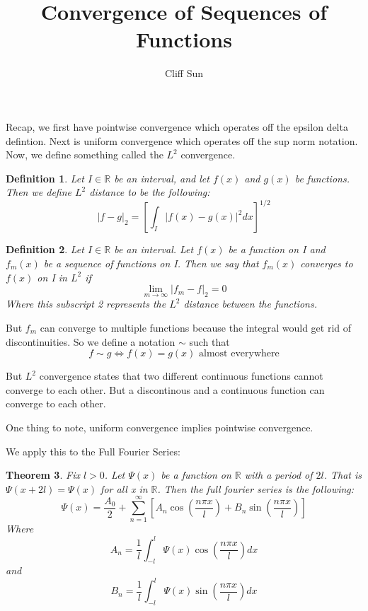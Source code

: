 \documentclass{article}
\title{Convergence of Sequences of Functions}
\author{Cliff Sun}
\newtheorem{theorem}{Theorem}[section]
\newtheorem{definition}[theorem]{Definition}
\begin{document}
\maketitle

Recap, we first have pointwise convergence which operates off the epsilon delta defintion. Next is uniform convergence which operates off the sup norm notation. Now, we define something called the $L^2$ convergence. 

\begin{definition}
    Let $I \in \mathbb{R}$ be an interval, and let $f(x)$ and $g(x)$ be functions. Then we define $L^{2}$ distance to be the following:
    \begin{equation}
        |f - g|_{2} = [ \int_{I}|f(x) - g(x)|^2 dx]^{1/2}
    \end{equation}
\end{definition}

\begin{definition}
    Let $I \in \mathbb{R}$ be an interval. Let $f(x)$ be a function on I and $f_m(x)$ be a sequence of functions on I. Then we say that $f_m(x)$ converges to $f(x)$ on I in $L^2$ if 
    \begin{equation}
        \lim_{m \rightarrow \infty} |f_m - f|_{2} = 0
    \end{equation}
    Where this subscript 2 represents the $L^2$ distance between the functions. 
\end{definition}

But $f_m$ can converge to multiple functions because the integral would get rid of discontinuities. So we define a notation $\sim$ such that 
\begin{equation}
    f \sim g \iff \textrm{$f(x) = g(x)$ almost everywhere}
\end{equation}

But $L^2$ convergence states that two different continuous functions cannot converge to each other. But a discontinous and a continuous function can converge to each other. 

One thing to note, uniform convergence implies pointwise convergence. 

We apply this to the Full Fourier Series:

\begin{theorem}
    Fix $l > 0$. Let $\Psi(x)$ be a function on $\mathbb{R}$ with a period of $2l$. That is $\Psi(x + 2l) = \Psi(x)$ for all x in $\mathbb{R}$. Then the full fourier series is the following:
    \begin{equation}
        \Psi(x) = \frac{A_0}{2} + \sum_{n =1}^{\infty} [A_n\cos(\frac{n\pi x}{l}) + B_n\sin(\frac{n\pi x}{l})]
    \end{equation}
    Where
    \begin{equation}
        A_n = \frac{1}{l}\int_{-l}^{l}\Psi(x)\cos(\frac{n\pi x}{l})dx
    \end{equation}
    and
    \begin{equation}
        B_n = \frac{1}{l}\int_{-l}^{l}\Psi(x)\sin(\frac{n\pi x}{l})dx
    \end{equation}
\end{theorem}
\end{document}
